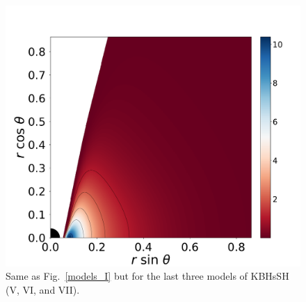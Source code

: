 \documentclass[twocolumn,aps,showpacs,showkeys,prd,superscriptaddress,byrevtex, amsmath]{revtex4-1}
\begin{document}
\begin{figure}
\includegraphics[scale=0.14]{figures/fig2_VII__10.pdf}
\hspace{-0.2cm}
\caption{Same as Fig.~\ref{models_I} but for the last three models of KBHsSH (V, VI, and VII). }
\label{models_II}
\end{figure}
\end{document}
